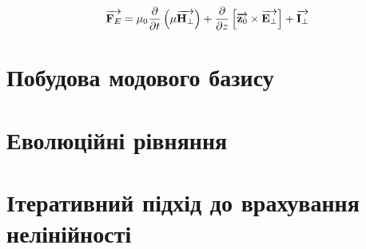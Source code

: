 \begin{equation*}
\overrightarrow{\mathbf F_E} = \mu_0 \frac{\partial }{\partial t} \left( \mu  \overrightarrow{\mathbf H_\perp} \right) +
\frac{\partial }{\partial z} \left[ \overrightarrow{\mathbf z_0} \times \overrightarrow{\mathbf E_\perp} \right] + \overrightarrow{\mathbf I_\perp}
\end{equation*}

\section{Побудова модового базису}


\section{Еволюційні рівняння}


\section{Ітеративний підхід до врахування нелінійності}
